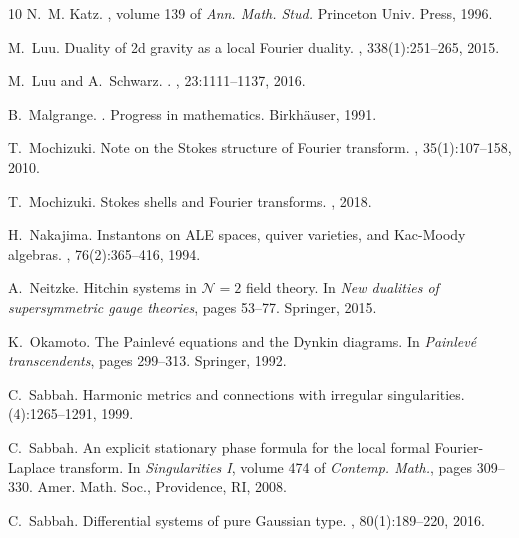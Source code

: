 \documentclass[11pt,a4paper]{amsart}
\numberwithin{equation}{section}
\begin{document}
\begin{thebibliography}{10}
N.~M. Katz.
, volume 139 of {\em Ann. Math. Stud.}
\newblock Princeton Univ. Press, 1996.

M.~Luu.
\newblock Duality of 2d gravity as a local {F}ourier duality.
, 338(1):251--265, 2015.

M.~Luu and A.~Schwarz.
.
, 23:1111--1137, 2016.

B.~Malgrange.
.
\newblock Progress in mathematics. Birkh{\"a}user, 1991.

T.~Mochizuki.
\newblock Note on the {Stokes} structure of {Fourier} transform.
, 35(1):107--158, 2010.

T.~Mochizuki.
\newblock Stokes shells and {F}ourier transforms.
, 2018.

H.~Nakajima.
\newblock Instantons on {ALE} spaces, quiver varieties, and {K}ac-{M}oody
  algebras.
, 76(2):365--416, 1994.

A.~Neitzke.
\newblock Hitchin systems in {$\mathcal N=2$} field theory.
\newblock In {\em New dualities of supersymmetric gauge theories}, pages
  53--77. Springer, 2015.

K.~Okamoto.
\newblock The {P}ainlev{\'e} equations and the {D}ynkin diagrams.
\newblock In {\em Painlev{\'e} transcendents}, pages 299--313. Springer, 1992.

C.~Sabbah.
\newblock Harmonic metrics and connections with irregular singularities.
(4):1265--1291, 1999.

C.~Sabbah.
\newblock An explicit stationary phase formula for the local formal
  {F}ourier-{L}aplace transform.
\newblock In {\em Singularities {I}}, volume 474 of {\em Contemp. Math.}, pages
  309--330. Amer. Math. Soc., Providence, RI, 2008.

C.~Sabbah.
\newblock Differential systems of pure {Gaussian} type.
, 80(1):189--220, 2016.


\end{thebibliography}
\end{document}
